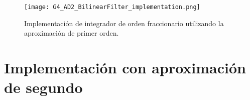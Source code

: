\begin{figure}[!ht] 
\caption{Implementación de integrador de orden fraccionario utilizando la aproximación de primer orden.}
\label{fig:G4_AD2_BilinearFilter_implementation.png}
\centering
\texttt{[image: G4\_AD2\_BilinearFilter\_implementation.png]}
\end{figure}

	\section{Implementación con aproximación de segundo}